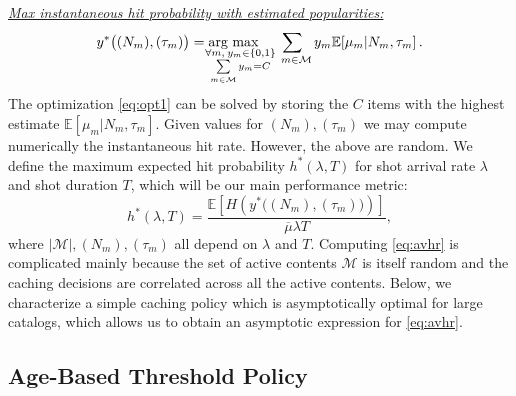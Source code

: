 \documentclass[10pt, conference, letterpaper]{IEEEtran}
\newcommand{\mean}[1]{\mathbb{E}\!\left[#1\right]}
\def\Mcal{\mathcal{M}}
\begin{document}
\vspace{0.1in}

\noindent \underline{\emph{Max instantaneous hit probability with estimated popularities:}}
\begin{equation}
y^*\big((N_m),(\tau_m)\big)=\arg\hspace{-0.15in}\max_{\hspace{-0.1in}\substack{\forall m,\:y_m\in \{0,1\}\\\sum\limits_{m\in\mathcal{M}}y_m=C}}\hspace{-0.05in}\sum_{\hspace{0.08in}m\in\mathcal{M}}y_m\mean{\mu_m|N_m,\tau_m}. \label{eq:opt1}
\end{equation}
The optimization \eqref{eq:opt1} can be solved by storing the $C$ items with the highest estimate $\mean{\mu_m|N_m,\tau_m}$. 
Given values for $(N_m),(\tau_m)$ we may compute numerically the instantaneous hit rate. However, the above are random. We define the maximum expected hit probability $h^*(\lambda,T)$ for shot arrival rate $\lambda$ and shot duration $T$, which will be our main performance metric:
\begin{equation}\label{eq:avhr}
h^*(\lambda,T)=\frac{\mean{H\left(y^*\big((N_m),(\tau_m)\big)\right)}}{\overline\mu\lambda T},
\end{equation}
where $|\Mcal|,(N_m),(\tau_m)$ all depend on $\lambda$ and $T$.
 Computing \eqref{eq:avhr} is complicated mainly because the set of active contents $\Mcal$ is itself random and the caching decisions are correlated across all the active contents. Below, we characterize a simple caching policy which is asymptotically optimal for large catalogs, which allows us to obtain an asymptotic expression for \eqref{eq:avhr}.



\subsection{Age-Based Threshold Policy}
\end{document}
